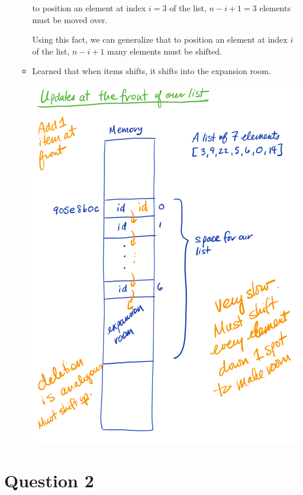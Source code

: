\documentclass[12pt]{article}
\begin{document}
\begin{enumerate}[a.]
\begin{itemize}
        to position an element at index $i = 3$ of the list, $n - i + 1 = 3$
        elements must be moved over.

        \bigskip

        Using this fact, we can generalize that to position an element at index $i$
        of the list, $n - i + 1$ many elements must be shifted.

        \item Learned that when items shifts, it shifts into the expansion room.

        \begin{center}
        \includegraphics[width=0.8 \linewidth]{images/worksheet_11_q1b_notes2.png}
        \end{center}
    \end{itemize}

\end{enumerate}

\section*{Question 2 }
\end{document}
